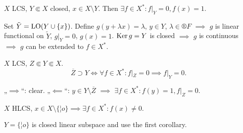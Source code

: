 \documentclass[12pt]{article}					%
\begin{document}
\begin{dusledek}
	$X$ LCS, $Y \Subset X$ closed, $x \in X \setminus Y$. Then $\exists f \in X^*: f|_Y = 0, f(x) = 1$.

	\begin{dukazin}
		Set $\tilde Y = \operatorname{LO}(Y \cup \{x\})$. Define $g(y  + λx) = λ$, $y \in Y$, $λ \in ®F$ $\implies$ $g$ is linear functional on $\tilde Y$, $g|_Y = 0$, $g(x) = 1$. $\operatorname{Ker} g = Y$ is closed $\implies$ $g$ is continuous $\implies$ $g$ can be extended to $f \in X^*$.
	\end{dukazin}
\end{dusledek}

\begin{dusledek}
	$X$ LCS, $Z \Subset Y \Subset X$.
	$$ \overline{Z} \supset Y \Leftrightarrow \forall f \in X^*: f|_Z = 0 \implies f|_Y = 0. $$

	\begin{dukazin}
		„$\implies$“: clear. „$\impliedby$“: $y \in Y \setminus \overline{Z}$ $\implies$ $\exists f \in X^*: f(y) = 1, f|_Z = 0$.
	\end{dukazin}
\end{dusledek}

\begin{dusledek}
	$X$ HLCS, $x \in X \setminus \{¦o\} \implies \exists f \in X^*: f(x) ≠ 0$.

	\begin{dukazin}
		$Y = \{¦o\}$ is closed linear subspace and use the first corollary.
	\end{dukazin}
\end{dusledek}

\end{document}
